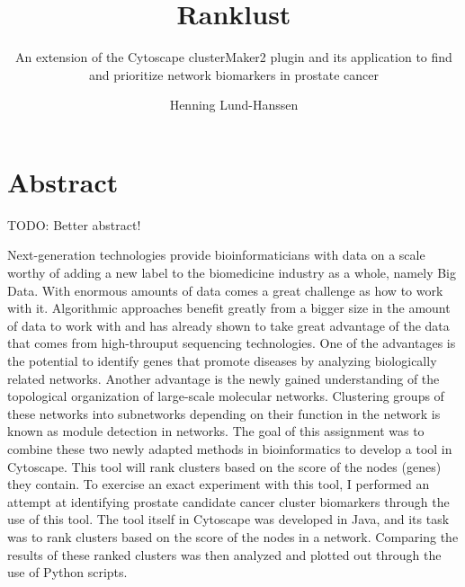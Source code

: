\documentclass[a4paper,UKenglish]{ifimaster}
\title{Ranklust}
\subtitle{An extension of the Cytoscape clusterMaker2 plugin and its application
to find and prioritize network biomarkers in prostate cancer}
\author{Henning Lund-Hanssen}
\begin{document}
\duoforside[program={Programming and Networks},
    dept={Department of Informatics},long]

\frontmatter{}
\printglossaries

\setlength{\parskip}{12pt}
\setlength{\parindent}{12pt}

\chapter*{Abstract}
TODO: Better abstract!

Next-generation technologies provide bioinformaticians with data on a scale
worthy of adding a new label to the biomedicine industry as a whole, namely
Big Data. With enormous amounts of data comes a great challenge as how to work
with it. Algorithmic approaches benefit greatly from a bigger size in the amount
of data to work with and has already shown to take great advantage of the data
that comes from high-throuput sequencing technologies. One of the advantages is
the potential to identify genes that promote diseases by analyzing biologically
related networks. Another advantage is the newly gained understanding of the
topological organization of large-scale molecular networks. Clustering groups
of these networks into subnetworks depending on their function in the network is
known as module detection in networks. The goal of this assignment was to
combine these two newly adapted methods in bioinformatics to develop a tool in
Cytoscape. This tool will rank clusters based on the score of the nodes (genes)
they contain. To exercise an exact experiment with this tool, I performed an
attempt at identifying prostate candidate cancer cluster biomarkers through the
use of this tool. The tool itself in Cytoscape was developed in Java, and its
task was to rank clusters based on the score of the nodes in a network.
Comparing the results of these ranked clusters was then analyzed and plotted out
through the use of Python scripts.


\tableofcontents{}
\listoffigures{}
\listoftables{}
\lstlistoflistings

\mainmatter{}





\backmatter{}
\printbibliography
\end{document}
